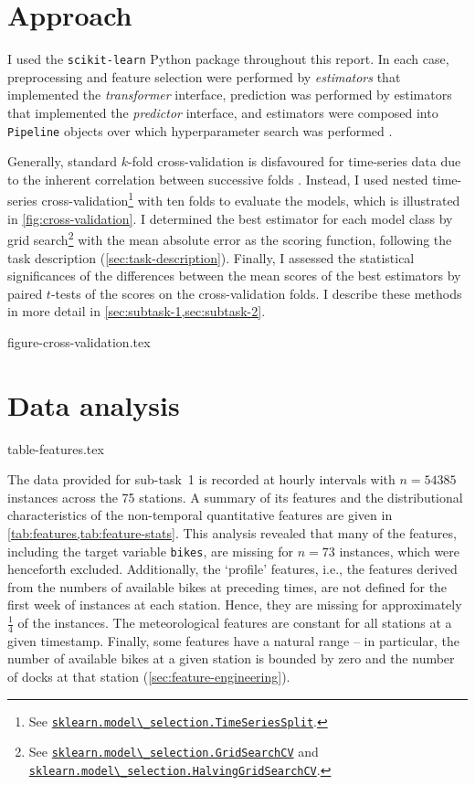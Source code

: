 \documentclass[11pt]{extarticle}
\newcommand{\sklearn}[2]{\href{https://scikit-learn.org/stable/modules/generated/sklearn.#1.#2.html}{\lstinline|sklearn.#1.#2|}}
\begin{document}
\section{Approach}
\label{sec:approach}

I used the \texttt{scikit-learn} Python package \parencite{Pedregosa2011} throughout
this report.
In each case, preprocessing and feature selection were performed by \emph{estimators}
that implemented the \emph{transformer} interface, prediction was performed by
estimators that implemented the \emph{predictor} interface, and estimators were
composed into \texttt{Pipeline} objects over which hyperparameter search was performed
\parencite[4-9]{Buitinck2013}.

Generally, standard $k$-fold cross-validation is disfavoured for time-series data due
to the inherent correlation between successive folds \parencite{Bergmeir2018}.
Instead, I used nested time-series cross-validation\footnote{See
  \sklearn{model\_selection}{TimeSeriesSplit}.
} with ten folds to evaluate the models, which is illustrated in
\cref{fig:cross-validation}.
I determined the best estimator for each model class by grid search\footnote{See
  \sklearn{model\_selection}{GridSearchCV} and
  \sklearn{model\_selection}{HalvingGridSearchCV}.
} with the mean absolute
error as the scoring function, following the task description (\cref{sec:task-description}).
Finally, I assessed the statistical significances of the differences between the mean
scores of the best estimators by paired $t$-tests of the scores on the cross-validation
folds.
I describe these methods in more detail in \cref{sec:subtask-1,sec:subtask-2}.

{figure-cross-validation.tex}

\section{Data analysis}
\label{sec:data-analysis}

{table-features.tex}

The data provided for sub-task~1 is recorded at hourly intervals with $n = 54385$
instances across the 75 stations.
A summary of its features and the distributional characteristics of the non-temporal
quantitative features are given in \cref{tab:features,tab:feature-stats}.
This analysis revealed that many of the features, including the target variable
\texttt{bikes}, are missing for $n = 73$ instances, which were henceforth excluded.
Additionally, the `profile' features, i.e., the features derived from the numbers of
available bikes at preceding times, are not defined for the first week of instances at
each station.
Hence, they are missing for approximately $\frac{1}{4}$ of the instances.
The meteorological features are constant for all stations at a given timestamp.
Finally, some features have a natural range -- in particular, the number of available
bikes at a given station is bounded by zero and the number of docks at that station
(\cref{sec:feature-engineering}).
\end{document}
